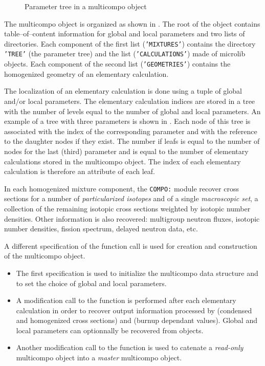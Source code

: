 \vskip 0.1cm

\begin{figure}[h!]  
\begin{center} 
\epsfxsize=9.5cm
\centerline{ }
\parbox{14cm}{\caption{Parameter tree in a {\sc multicompo} object}\label{fig:ctree}}   
\end{center}  
\end{figure}

The {\sc multicompo} object is organized as shown in . The root of the object contains
table--of--content information for global and local parameters and two lists of
directories. Each component of the first list ({\tt 'MIXTURES'})
contains the directory {\tt 'TREE'} (the parameter tree) and the list ({\tt 'CALCULATIONS'})
made of {\sc microlib} objects. Each component of the second list ({\tt 'GEOMETRIES'}) contains the homogenized
geometry of an elementary calculation.

\vskip 0.1cm

The localization of an elementary calculation is done using
a tuple of global and/or local parameters. The elementary calculation indices are
stored in a tree with the number of levels equal to the number of global and local parameters.
An example of a tree with three parameters is shown in . Each node
of this tree is associated with the index of the corresponding parameter and with the
reference to the daughter nodes if they exist. The number if leafs is equal to the number
of nodes for the last (third) parameter and is equal to the number of elementary
calculations stored in the {\sc multicompo} object. The index of each elementary calculation is
therefore an attribute of each leaf.

\vskip 0.1cm

In each homogenized mixture component, the {\tt COMPO:} module recover
cross sections for a number of {\sl particularized isotopes} and of a single {\sl macroscopic
set}, a collection of the remaining isotopic cross sections weighted by isotopic number densities.
Other information is also recovered: multigroup neutron
fluxes, isotopic number densities, fission spectrum, delayed neutron data, etc.

\vskip 0.1cm

A different specification of the  function call is used for
creation and construction of the {\sc multicompo} object.
\begin{itemize}
\item The first specification is used to initialize the {\sc multicompo} data structure
and to set the choice of global and local parameters.
\item A modification call to the  function is performed after each
elementary calculation in order to recover output information processed by 
(condensed and homogenized cross sections) and  (burnup dependant values).
Global and local parameters can optionnally be recovered from 
objects.
\item Another modification call to the  function is used to
catenate a {\sl read-only} {\sc multicompo} object into a {\sl master} {\sc multicompo} object.
\end{itemize}

